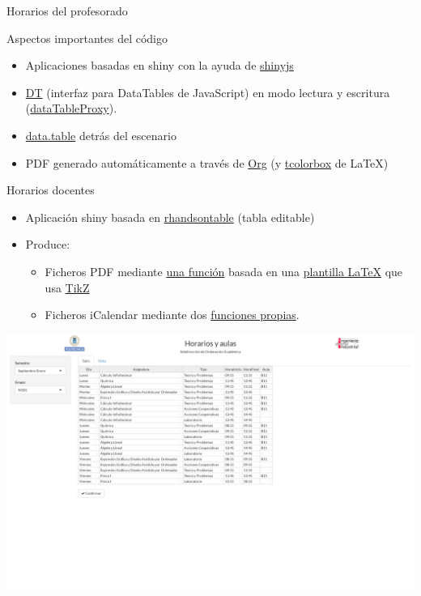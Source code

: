 \documentclass[spanish, xcolor={usenames,svgnames,dvipsnames}]{beamer}
\begin{document}
\begin{frame}[label={sec:orgf6e9853}]{Horarios del profesorado}
\begin{block}{Aspectos importantes del código}
\begin{itemize}
\item Aplicaciones basadas en shiny con la ayuda de \href{https://daattali.com/shiny/shinyjs-demo/}{shinyjs}
\item \href{https://github.com/Rdatatable/data.table/wiki}{DT} (interfaz para DataTables de JavaScript) en modo lectura y escritura (\href{https://yihui.shinyapps.io/DT-proxy/}{dataTableProxy}).
\item \href{https://github.com/Rdatatable/data.table/wiki}{data.table} detrás del escenario
\item PDF generado automáticamente a través de \href{http://orgmode.org/}{Org} (y \href{https://www.ctan.org/pkg/tcolorbox}{tcolorbox} de \LaTeX{})
\end{itemize}
\end{block}
\end{frame}
\begin{frame}[label={sec:org71b2763}]{Horarios docentes}
\begin{itemize}
\item Aplicación shiny basada en \href{http://jrowen.github.io/rhandsontable/}{rhandsontable} (tabla editable)
\item Produce:
\begin{itemize}
\item Ficheros PDF mediante \href{https://github.com/SOA-ETSIDI/horarios/blob/master/csv2tt.R}{una función} basada en una \href{https://github.com/SOA-ETSIDI/horarios/blob/master/timetable.tex}{plantilla \LaTeX{}} que usa \href{https://en.wikipedia.org/wiki/PGF/TikZ}{TikZ}
\item Ficheros iCalendar mediante dos \href{https://github.com/SOA-ETSIDI/misc/blob/master/funciones.R}{funciones propias}.
\end{itemize}
\end{itemize}
\end{frame}
\begin{frame}[label={sec:org108e578}]{}
\begin{center}
\includegraphics[width=.9\linewidth]{images/horarios.png}
\end{center}
\end{frame}
\end{document}
